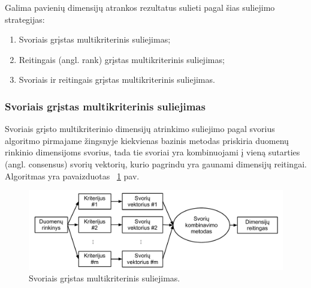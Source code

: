 Galima pavienių dimensijų atrankos rezultatus sulieti pagal šias suliejimo
strategijas:
\begin{enumerate}
  \item Svoriais grįstas multikriterinis suliejimas;
  \item Reitingais (angl. rank) grįstas multikriterinis suliejimas;
  \item Svoriais ir reitingais grįstas multikriterinis suliejimas.
\end{enumerate}

\subsubsection{Svoriais grįstas multikriterinis suliejimas}

Svoriais grįsto multikriterinio dimensijų atrinkimo suliejimo pagal svorius algoritmo
pirmajame žingsnyje kiekvienas bazinis metodas priskiria duomenų rinkinio
dimensijoms svorius, tada tie svoriai yra kombinuojami į vieną sutarties
(angl. consensus) svorių vektorių, kurio pagrindu yra gaunami dimensijų 
reitingai. Algoritmas yra pavaizduotas ~\ref{fig:figure4} pav.
\begin{figure}
 \centering
 \includegraphics[width=1\textwidth]{images/score_based_fusion.pdf}
 \caption{Svoriais grįstas multikriterinis suliejimas.}
 \label{fig:figure4}
\end{figure}
